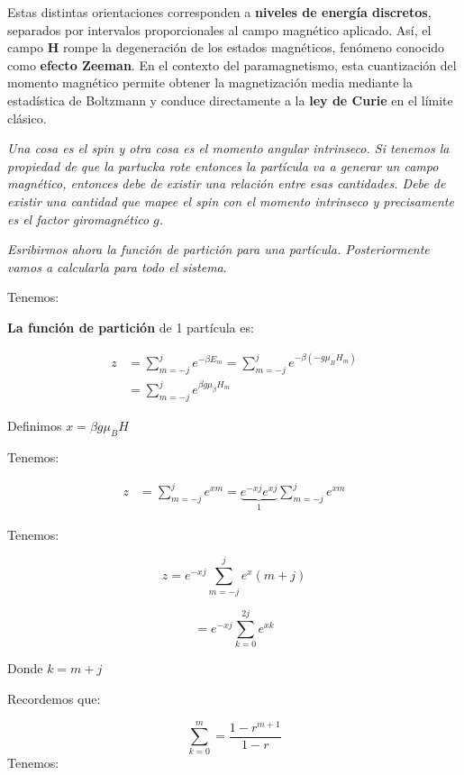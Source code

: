 \documentclass{article}
\begin{document}
Estas distintas orientaciones corresponden a \textbf{niveles de energía discretos}, separados por intervalos proporcionales al campo magnético aplicado.  
Así, el campo \(\mathbf{H}\) rompe la degeneración de los estados magnéticos, fenómeno conocido como \textbf{efecto Zeeman}.  
En el contexto del paramagnetismo, esta cuantización del momento magnético permite obtener la magnetización media mediante la estadística de Boltzmann y conduce directamente a la \textbf{ley de Curie} en el límite clásico.


\textit{Una cosa es el spin y otra cosa es el momento angular intrinseco. Si tenemos la propiedad de que la partucka rote entonces la partícula va a generar un campo magnético, entonces debe de existir una relación entre esas cantidades. Debe de existir una cantidad que mapee el spin con el momento intrinseco y precisamente es el factor giromagnético $g$.}

\textit{Esribirmos ahora la función de partición para una partícula. Posteriormente vamos a calcularla para todo el sistema}.


Tenemos:


\textbf{La función de partición} de 1 partícula es:


\begin{equation}
\begin{split}
 z &= \sum\limits_{m=-j}^{j} e^{-\beta E_{m}} = \sum\limits_{m=-j}^{j}  e^{ - \beta \left(  -g\mu_{B}H_{m}   \right) }\\
 &= \sum\limits_{m=-j}^{j} e^{\beta g\mu_{\beta} H_{m}} 
\end{split}
\end{equation}

Definimos $x=\beta g\mu_{B}H$


Tenemos:


\begin{equation}
\begin{split}
z &= \sum\limits_{m=-j}^{j} e^{xm} = \underbrace{e^{-xj}e^{xj}}_{1} \sum\limits_{m=-j}^{j}e^{xm}
\end{split}
\end{equation}


Tenemos:


\[ z=e^{-xj} \sum\limits_{m=-j}^{j} e^{x} (m+j) \]

\[  = e^{-xj} \sum\limits_{k=0}^{2j}  e^{xk} \]

Donde $k=m+j$


Recordemos que:


\[   \sum\limits_{k=0}^{m} = \frac{1-r^{m+1}}{1-r}  \]
Tenemos: 
\end{document}
